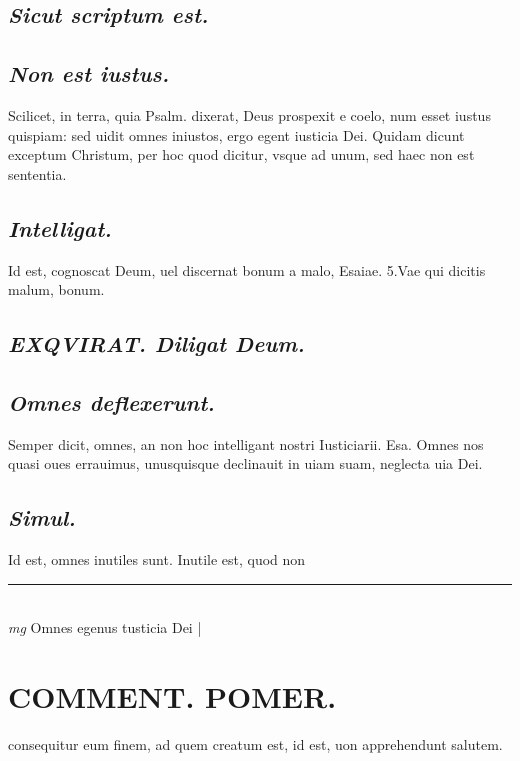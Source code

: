 \documentclass{article}
\begin{document}
\begin{pages}
\subsection*{\textit{Sicut scriptum est. }}
{}
\subsection*{\textit{Non est iustus. }}\pstart Scilicet, in terra, quia Psalm. dixerat, Deus prospexit e coelo, num esset iustus quispiam: sed uidit omnes iniustos, ergo egent iusticia Dei. Quidam dicunt exceptum Christum, per hoc quod dicitur, vsque  ad unum, sed haec non est sententia.   \pend
{}
{}
\subsection*{\textit{Intelligat. }}\pstart Id est, cognoscat Deum, uel discernat bonum a malo, Esaiae. 5.Vae qui dicitis malum, bonum.  \pend
{}
{}
\subsection*{\textit{EXQVIRAT. Diligat Deum. }}
{}
\subsection*{\textit{Omnes deflexerunt. }}\pstart Semper dicit, omnes, an non hoc intelligant nostri Iusticiarii. Esa. Omnes nos quasi oues errauimus, unusquisque declinauit in uiam suam, neglecta uia Dei.  \pend
{}
{}
\subsection*{\textit{Simul. }}\pstart Id est, omnes inutiles sunt. Inutile est, quod non  \pend
\vspace{0.5cm}\noindent
\vspace{0.2cm}\rule{1cm}{0.2pt}\\ 
\hspace{0.2cm}\textit{mg}
\footnotesize Omnes egenus tusticia Dei
\normalsize| 
\section*{COMMENT. POMER.  }\pstart consequitur eum finem, ad quem creatum est, id est, uon apprehendunt salutem.   \pend
{}
{}

\end{pages}
\end{document}
